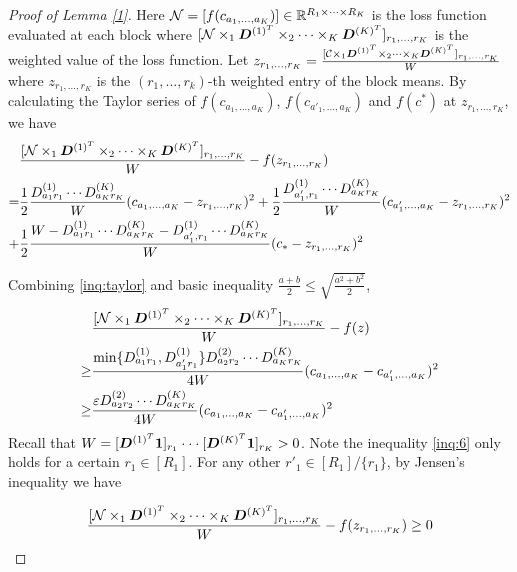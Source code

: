 \documentclass{article}
\begin{document}
\begin{appendices}
\begin{proof}[Proof of Lemma \ref{1}]
Here $\mathcal{N}=[f(c_{a_1,...,a_K})]\in \mathbb{R}^{R_1\times\cdots\times R_K}$ is the loss function evaluated at each block where $[\mathcal{N}\times_1\boldsymbol{D}^{(1)^T}\times_2\cdots \times_K\boldsymbol{D}^{(K)^T}]_{r_1,...,r_K}$ is the weighted value of the loss function.
Let $z_{r_1,...,r_K} = \frac{[\mathcal{C}\times_1\boldsymbol{D}^{(1)^T}\times_2\cdots\times_K \boldsymbol{D}^{(K)^T}]_{r_1,...,r_K}}{W}$ where $z_{r_1,...,r_K}$ is the $(r_1,...,r_k)$-th weighted entry of the block means. By calculating the Taylor series of $f(c_{a_1,...,a_K})$, $f(c_{a'_1,...,a_K})$ and $f(c^*)$ at $z_{r_1,...,r_K}$, we have
\begin{equation}
	\begin{split}\label{inq:taylor}
	 &\frac{[\mathcal{N}\times_1\boldsymbol{D}^{(1)^T}\times_2\cdots \times_K\boldsymbol{D}^{(K)^T}]_{r_1,...,r_K}}{W}-f(z_{r_1,...,r_K})\\
	 =&\frac{1}{2} \frac{D_{a_1r_1}^{(1)}\cdots D_{a_Kr_K}^{(K)}}{W}(c_{a_1,...,a_K}-z_{r_1,...,r_K})^2+\frac{1}{2} \frac{D_{a'_1,r_1}^{(1)}\cdots D_{a_Kr_K}^{(K)}}{W}(c_{a'_1,...,a_K}-z_{r_1,...,r_K})^2 \\
	 +&\frac{1}{2}  \frac{W-D_{a_1r_1}^{(1)}\cdots D_{a_Kr_K}^{(K)}-D_{a'_1,r_1}^{(1)}\cdots D_{a_Kr_K}^{(K)}}{W}(c_*-z_{r_1,...,r_K})^2 
	\end{split}
\end{equation}

Combining \eqref{inq:taylor} and  basic inequality $\frac{a+b}{2}\leq \sqrt{\frac{a^2+b^2}{2}}$,
\begin{equation}
\begin{split}
   &\frac{[\mathcal{N}\times_1\boldsymbol{D}^{(1)^T}\times_2\cdots \times_K\boldsymbol{D}^{(K)^T}]_{r_1,...,r_K}}{W}-f(z)\\
   \geq &\frac{\min\{D_{a_1r_1}^{(1)},D_{a_1'r_1}^{(1)}\}D_{a_2r_2}^{(2)}\cdots D_{a_Kr_K}^{(K)}}{4W}(c_{a_1,...,a_K}-c_{a_1',...,a_K})^2\\
   \geq & \frac{\varepsilon D_{a_2r_2}^{(2)}\cdots D_{a_Kr_K}^{(K)}}{4W}(c_{a_1,...,a_K}-c_{a_1',...,a_K})^2\\
\end{split}\label{inq:6}
\end{equation}
Recall that $W = [\boldsymbol{D}^{(1)^T}\boldsymbol{1}]_{r_1}\cdot\cdot\cdot [\boldsymbol{D}^{(K)^T}\boldsymbol{1}]_{r_K}>0$.
Note the inequality \eqref{inq:6} only holds for a certain $r_1\in[R_1]$. For any other $r'_1\in [R_1]/\{r_1\}$, by Jensen's inequality we have

\begin{equation} 
    \frac{[\mathcal{N}\times_1\boldsymbol{D}^{(1)^T}\times_2\cdots \times_K\boldsymbol{D}^{(K)^T}]_{r_1,...,r_K}}{W}-f(z_{r_1,...,r_K}) \geq 0
    \label{inq:7}
\end{equation}



\end{proof}
\end{appendices}
\end{document}
